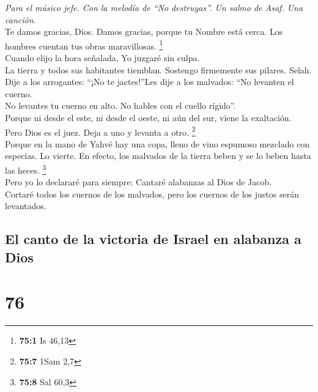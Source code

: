 \emph{Para el músico jefe. Con la melodía de ``No destruyas''. Un salmo
de Asaf. Una canción.}\\
 Te damos gracias, Dios. Damos gracias, porque tu Nombre
está cerca. Los hombres cuentan tus obras maravillosas. \footnote{\textbf{75:1}
  Is 46,13}\\
 Cuando elijo la hora señalada, Yo juzgaré sin culpa.\\
 La tierra y todos sus habitantes tiemblan. Sostengo
firmemente sus pilares. Selah.\\
 Dije a los arrogantes: ``¡No te jactes!''Les dije a los
malvados: ``No levanten el cuerno.\\
 No levantes tu cuerno en alto. No hables con el cuello
rígido''.\\
 Porque ni desde el este, ni desde el oeste, ni aún del
sur, viene la exaltación.\\
 Pero Dios es el juez. Deja a uno y levanta a otro.
\footnote{\textbf{75:7} 1Sam 2,7}\\
 Porque en la mano de Yahvé hay una copa, lleno de vino
espumoso mezclado con especias. Lo vierte. En efecto, los malvados de la
tierra beben y se lo beben hasta las heces. \footnote{\textbf{75:8} Sal
  60,3}\\
 Pero yo lo declararé para siempre: Cantaré alabanzas al
Dios de Jacob.\\
 Cortaré todos los cuernos de los malvados, pero los
cuernos de los justos serán levantados.

\hypertarget{el-canto-de-la-victoria-de-israel-en-alabanza-a-dios}{%
\subsection{El canto de la victoria de Israel en alabanza a
Dios}\label{el-canto-de-la-victoria-de-israel-en-alabanza-a-dios}}

\hypertarget{section-74}{%
\section{76}\label{section-74}}

